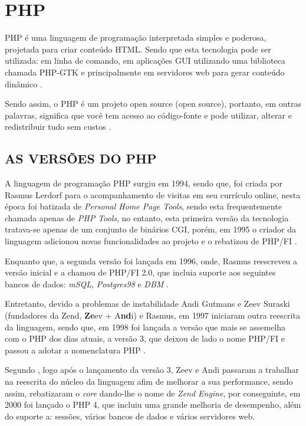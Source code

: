 \chapter{PHP}
\label{php}

\acs{PHP} é uma linguagem de programação interpretada simples e poderosa,
projetada para criar conteúdo \acs{HTML}. Sendo que esta tecnologia pode ser
utilizada: em linha de comando, em aplicações \ac{GUI} utilizando uma biblioteca
chamada \acs{PHP-GTK} e principalmente em servidores web para gerar conteúdo
dinâmico \cite{programmingPhp}.

Sendo assim, o \acs{PHP} é um projeto \acs{open source} (\acl{open source}),
portanto, em outras palavras, significa que você tem acesso ao código-fonte e
pode utilizar, alterar e redistribuir tudo sem custos \cite{phpAndMysqlWebDevelopment}.

\section{AS VERSÕES DO PHP}

A linguagem de programação \acs{PHP} surgiu em 1994, sendo que, foi criada por
Rasmus Lerdorf para o acompanhamento de visitas em seu currículo online, nesta
época foi batizada de \textit{Personal Home Page Tools}, sendo esta
frequentemente chamada apenas de \textit{PHP Tools}, no entanto, esta primeira
versão da tecnologia tratava-se apenas de um conjunto de binários \ac{CGI},
porém, em 1995 o criador da linguagem adicionou novas funcionalidades ao projeto
e o rebatizou de \ac{PHP/FI} \cite{phpProgramandoComOrientacaoAObjetos}.

Enquanto que, a segunda versão foi lançada em 1996, onde, 
Rasmus reescreveu a versão inicial e a chamou de \acs{PHP/FI} 2.0, que incluia 
suporte aos seguintes bancos de dados: \textit{mSQL},
\textit{Postgres98} e \textit{DBM} \cite{programmingPhp}.

Entretanto, devido a problemas de instabilidade Andi Gutmans e Zeev
Suraski (fundadores da Zend, \textbf{Ze}ev + A\textbf{nd}i) e Rasmus, em 1997
iniciaram outra reescrita da linguagem, sendo que, em 1998 foi lançada a versão
que mais se assemelha com o \acs{PHP} dos dias atuais, a versão 3, que deixou
de lado o nome \acs{PHP/FI} e passou a adotar a nomenclatura \ac{PHP}
\cite{websitePHPHistoria}.

Segundo , logo após o lançamento
da versão 3, Zeev e Andi passaram a trabalhar na reescrita do núcleo da 
linguagem afim de melhorar a sua performance, sendo assim, rebatizaram o
\textit{core} dando-lhe o nome de \textit{Zend Engine}, por conseguinte, em
2000 foi lançado o \acs{PHP} 4, que incluiu uma grande melhoria de desempenho, 
além do suporte a: sessões, vários bancos de dados e vários servidores web.

